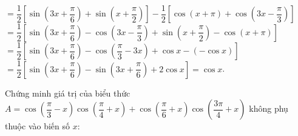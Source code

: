 \begin{bt}
{\begin{enumerate}
			$=\dfrac{1}{2}\left[\sin \left(3x+\dfrac{\pi}{6}\right)+\sin \left(x+\dfrac{\pi}{2}\right)\right]-\dfrac{1}{2}\left[\cos\left(x+\pi \right)+\cos \left(3x-\dfrac{\pi}{3} \right) \right]$ \\
			$=\dfrac{1}{2}\left[\sin \left(3x+\dfrac{\pi}{6} \right)-\cos \left(3x-\dfrac{\pi}{3} \right) +\sin \left(x+\dfrac{\pi}{2} \right) -\cos \left(x+\pi \right) \right]$\\
			$=\dfrac{1}{2}\left[\sin \left(3x+\dfrac{\pi}{6} \right)-\cos \left(\dfrac{\pi}{3} -3x \right) +\cos x - (-\cos x) \right]$\\
			$=\dfrac{1}{2}\left[\sin \left(3x+\dfrac{\pi}{6} \right) - \sin \left(3x+\dfrac{\pi}{6} \right) + 2\cos x \right] = \cos x$.
		\end{enumerate}
	}
\end{bt}
\begin{bt}%
	Chứng minh giá trị của biểu thức $A=\cos \left(\dfrac{\pi}{3}-x\right)\cos \left(\dfrac{\pi}{4}+x\right)+\cos \left(\dfrac{\pi}{6}+x\right)\cos \left(\dfrac{3\pi}{4}+x\right)$ không phụ thuộc vào biến số $x$:
\end{bt}
